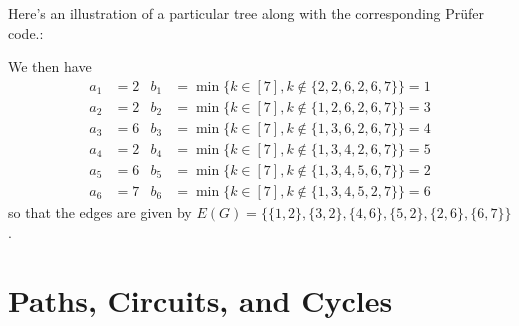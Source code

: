 \documentclass[12pt, a4paper]{book}
\theoremstyle{nonumberplain}
\begin{document}
Here's an illustration of a particular tree along with the corresponding Pr\"ufer code.:
\begin{center}
\end{center}
We then have
\begin{align*}
    a_1&=2 & b_1 &= \min\{k\in[7],k\notin\{2,2,6,2,6,7\}\}=1\\
    a_2&=2 & b_2 &= \min\{k\in[7],k\notin\{1,2,6,2,6,7\}\}=3\\
    a_3&=6 & b_3 &= \min\{k\in[7],k\notin\{1,3,6,2,6,7\}\}=4\\
    a_4&=2 & b_4 &= \min\{k\in[7],k\notin\{1,3,4,2,6,7\}\}=5\\
    a_5&=6 & b_5 &= \min\{k\in[7],k\notin\{1,3,4,5,6,7\}\}=2\\
    a_6&=7 & b_6 &= \min\{k\in[7],k\notin\{1,3,4,5,2,7\}\}=6
\end{align*}
so that the edges are given by $E(G)=\{ \{1,2\},\{3,2\},\{4,6\},\{5,2\},\{2,6\},\{6,7\}\}$.


\section{Paths, Circuits, and Cycles}
\end{document}
